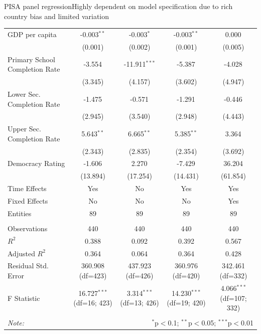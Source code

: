 \documentclass[10pt]{beamer}
\begin{document}
\begin{frame}{PISA panel regression}{Highly dependent on model specification due to rich country bias and limited variation}
\begin{table}[!htbp]
{\begin{tabular}{@{\extracolsep{5pt}}lcccc}
                 GDP per capita & -0.003$^{**}$ & -0.003$^{*}$ & -0.003$^{**}$ & 0.000$^{}$ \\
                & (0.001) & (0.002) & (0.001) & (0.005) \\
                 Primary School Completion Rate & -3.554$^{}$ & -11.911$^{***}$ & -5.387$^{}$ & -4.028$^{}$ \\
                & (3.345) & (4.157) & (3.602) & (4.947) \\
                 Lower Sec. Completion Rate & -1.475$^{}$ & -0.571$^{}$ & -1.291$^{}$ & -0.446$^{}$ \\
                & (2.945) & (3.540) & (2.948) & (4.443) \\
                 Upper Sec. Completion Rate & 5.643$^{**}$ & 6.665$^{**}$ & 5.385$^{**}$ & 3.364$^{}$ \\
                & (2.343) & (2.835) & (2.354) & (3.692) \\
                 Democracy Rating & -1.606$^{}$ & 2.270$^{}$ & -7.429$^{}$ & 36.204$^{}$ \\
                & (13.894) & (17.254) & (14.431) & (61.854) \\
                 Time Effects & Yes & No & Yes & Yes \\
                 Fixed Effects & No & No & No & Yes \\
                 Entities & 89 & 89 & 89 & 89 \\
                \hline \\[-1.8ex]
                 Observations & 440 & 440 & 440 & 440 \\
                 $R^2$ & 0.388 & 0.092 & 0.392 & 0.567 \\
                 Adjusted $R^2$ & 0.364 & 0.064 & 0.364 & 0.428 \\
                 Residual Std. Error & 360.908 (df=423) & 437.923 (df=426) & 360.976 (df=420) & 342.461 (df=332) \\
                 F Statistic & 16.727$^{***}$ (df=16; 423) & 3.314$^{***}$ (df=13; 426) & 14.230$^{***}$ (df=19; 420) & 4.066$^{***}$ (df=107; 332) \\
                \hline
                \hline \\[-1.8ex]
                \textit{Note:} & \multicolumn{4}{r}{$^{*}$p$<$0.1; $^{**}$p$<$0.05; $^{***}$p$<$0.01} \\
                \end{tabular}
        }
        \end{table}
\end{frame}
\end{document}
